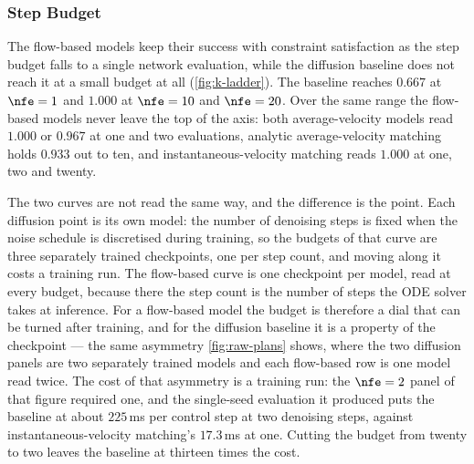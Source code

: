 \subsubsection{Step Budget}\label{sec:res:fewstep}

The flow-based models keep their success with constraint satisfaction as the step budget falls to a
single network evaluation, while the diffusion baseline does not reach it at a small budget at all
(\autoref{fig:k-ladder}). The baseline reaches $0.667$ at $\nfe=1$ and $1.000$ at $\nfe=10$ and
$\nfe=20$. Over the same range the flow-based models never leave the top of the axis: both
average-velocity models read $1.000$ or $0.967$ at one and two evaluations, analytic average-velocity
matching holds $0.933$ out to ten, and instantaneous-velocity matching reads $1.000$ at one, two and
twenty.

The two curves are not read the same way, and the difference is the point. Each diffusion point is its own
model: the number of denoising steps is fixed when the noise schedule is discretised during training, so
the budgets of that curve are three separately trained checkpoints, one per step count, and moving along
it costs a training run. The flow-based curve is one checkpoint per model, read at every budget, because
there the step count is the number of steps the ODE solver takes at inference. For a flow-based model the
budget is therefore a dial that can be turned after training, and for the diffusion baseline it is a
property of the checkpoint --- the same asymmetry \autoref{fig:raw-plans} shows, where the two diffusion
panels are two separately trained models and each flow-based row is one model read twice. The cost of
that asymmetry is a training run: the $\nfe=2$ panel of that figure required one, and the single-seed
evaluation it produced puts the baseline at about $225$\,ms per control step at two denoising steps,
against instantaneous-velocity matching's $17.3$\,ms at one. Cutting the budget from twenty to two
leaves the baseline at thirteen times the cost.


